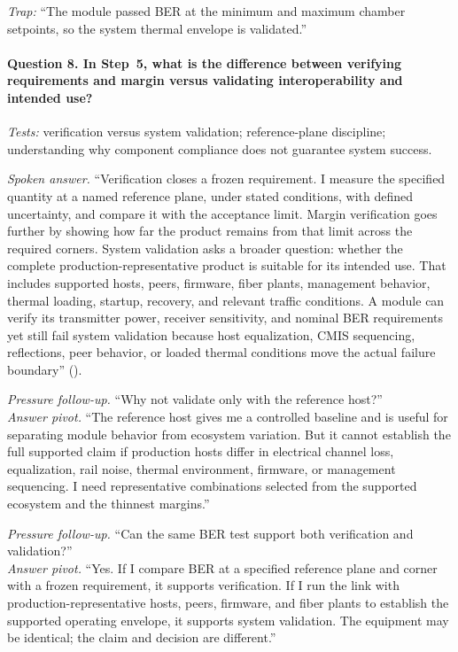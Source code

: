 \textit{Trap:} ``The module passed BER at the minimum and maximum chamber
setpoints, so the system thermal envelope is validated.''

\paragraph{Question 8. In Step~5, what is the difference between verifying
requirements and margin versus validating interoperability and intended use?}
\textit{Tests:} verification versus system validation; reference-plane
discipline; understanding why component compliance does not guarantee system
success.

\textit{Spoken answer.}
``Verification closes a frozen requirement. I measure the specified quantity at
a named reference plane, under stated conditions, with defined uncertainty, and
compare it with the acceptance limit. Margin verification goes further by
showing how far the product remains from that limit across the required corners.
System validation asks a broader question: whether the complete
production-representative product is suitable for its intended use. That
includes supported hosts, peers, firmware, fiber plants, management behavior,
thermal loading, startup, recovery, and relevant traffic conditions. A module
can verify its transmitter power, receiver sensitivity, and nominal BER
requirements yet still fail system validation because host equalization, CMIS
sequencing, reflections, peer behavior, or loaded thermal conditions move the
actual failure boundary''
().

\textit{Pressure follow-up.} ``Why not validate only with the reference
host?''\\
\textit{Answer pivot.} ``The reference host gives me a controlled baseline and
is useful for separating module behavior from ecosystem variation. But it cannot
establish the full supported claim if production hosts differ in electrical
channel loss, equalization, rail noise, thermal environment, firmware, or
management sequencing. I need representative combinations selected from the
supported ecosystem and the thinnest margins.''

\textit{Pressure follow-up.} ``Can the same BER test support both verification
and validation?''\\
\textit{Answer pivot.} ``Yes. If I compare BER at a specified reference plane
and corner with a frozen requirement, it supports verification. If I run the
link with production-representative hosts, peers, firmware, and fiber plants to
establish the supported operating envelope, it supports system validation. The
equipment may be identical; the claim and decision are different.''

